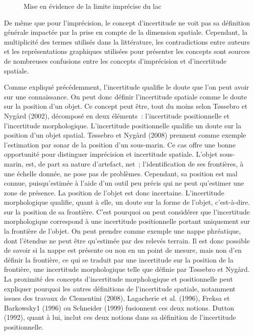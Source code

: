 \begin{figure}
  \centering
  \caption{Mise en évidence de la limite imprécise du lac}
  \label{fig:lim_champ_imp}
\end{figure}

De même que pour l’imprécision, le concept d’incertitude ne voit pas
sa définition générale impactée par la prise en compte de la dimension
spatiale. Cependant, la multiplicité des termes utilisés dans la
littérature, les contradictions entre auteurs et les représentations
graphiques utilisées pour présenter les concepts sont sources de
nombreuses confusions entre les concepts d’imprécision et
d’incertitude spatiale.

Comme expliqué précédemment, l’incertitude qualifie le doute que l’on
peut avoir sur une connaissance. On peut donc définir l’incertitude
spatiale comme le doute sur la position d’un objet. Ce concept peut
être, tout du moins selon Tøssebro et Nygård (2002), décomposé en deux
éléments : l’incertitude positionnelle et l’incertitude
morphologique. L’incertitude positionnelle qualifie un doute sur la
position d’un objet spatial. Tøssebro et Nygård (2008) prennent comme
exemple l’estimation par sonar de la position d’un sous-marin. Ce cas
offre une bonne opportunité pour distinguer imprécision et incertitude
spatiale. L’objet sous-marin, est, de part sa nature d’artefact, net ;
l’identification de ses frontières, à une échelle donnée, ne pose pas
de problèmes. Cependant, sa position est mal connue, puisqu’estimée à
l’aide d’un outil peu précis qui ne peut qu’estimer une zone de
présence. La position de l’objet est donc incertaine. L’incertitude
morphologique qualifie, quant à elle, un doute sur la forme de
l’objet, c’est-à-dire. sur la position de sa frontière. C’est pourquoi
on peut considérer que l’incertitude morphologique correspond à une
incertitude positionnelle portant uniquement sur la frontière de
l’objet. On peut prendre comme exemple une nappe phréatique, dont
l’étendue ne peut être qu’estimée par des relevés terrain. Il est donc
possible de savoir si la nappe est présente ou non en un point de
mesure, mais non d’en définir la frontière, ce qui se traduit par une
incertitude sur la position de la frontière, une incertitude
morphologique telle que définie par Tøssebro et Nygård. La proximité
des concepts d’incertitude morphologique et positionnelle peut
expliquer pourquoi les autres définitions de l’incertitude spatiale,
notamment issues des travaux de Clementini (2008), Lagacherie et
al. (1996), Freksa et Barkowsky1 (1996) ou Schneider (1999) fusionnent
ces deux notions. Dutton (1992), quant à lui, inclut ces deux notions
dans sa définition de l’incertitude positionnelle.

